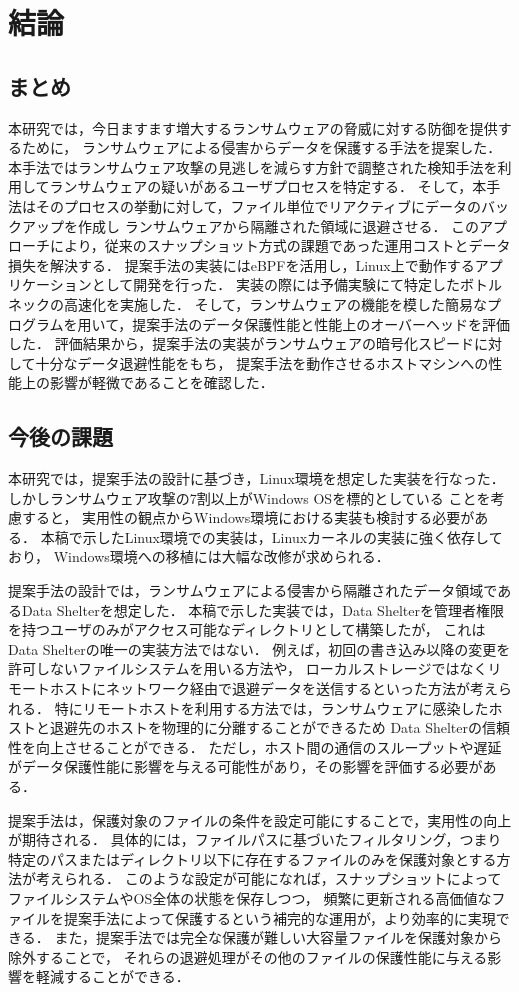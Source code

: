 \chapter{結論}
\label{chap:conclusion}
\section{まとめ}
本研究では，今日ますます増大するランサムウェアの脅威に対する防御を提供するために，
ランサムウェアによる侵害からデータを保護する手法を提案した．
本手法ではランサムウェア攻撃の見逃しを減らす方針で調整された検知手法を利用してランサムウェアの疑いがあるユーザプロセスを特定する．
そして，本手法はそのプロセスの挙動に対して，ファイル単位でリアクティブにデータのバックアップを作成し
ランサムウェアから隔離された領域に退避させる．
このアプローチにより，従来のスナップショット方式の課題であった運用コストとデータ損失を解決する．
提案手法の実装にはeBPFを活用し，Linux上で動作するアプリケーションとして開発を行った．
実装の際には予備実験にて特定したボトルネックの高速化を実施した．
そして，ランサムウェアの機能を模した簡易なプログラムを用いて，提案手法のデータ保護性能と性能上のオーバーヘッドを評価した．
評価結果から，提案手法の実装がランサムウェアの暗号化スピードに対して十分なデータ退避性能をもち，
提案手法を動作させるホストマシンへの性能上の影響が軽微であることを確認した．

\section{今後の課題}
本研究では，提案手法の設計に基づき，Linux環境を想定した実装を行なった．
しかしランサムウェア攻撃の7割以上がWindows OSを標的としている \cite{trendmicro-report} ことを考慮すると，
実用性の観点からWindows環境における実装も検討する必要がある．
本稿で示したLinux環境での実装は，Linuxカーネルの実装に強く依存しており，
Windows環境への移植には大幅な改修が求められる．

提案手法の設計では，ランサムウェアによる侵害から隔離されたデータ領域であるData Shelterを想定した．
本稿で示した実装では，Data Shelterを管理者権限を持つユーザのみがアクセス可能なディレクトリとして構築したが，
これはData Shelterの唯一の実装方法ではない．
例えば，初回の書き込み以降の変更を許可しないファイルシステムを用いる方法や，
ローカルストレージではなくリモートホストにネットワーク経由で退避データを送信するといった方法が考えられる．
特にリモートホストを利用する方法では，ランサムウェアに感染したホストと退避先のホストを物理的に分離することができるため
Data Shelterの信頼性を向上させることができる．
ただし，ホスト間の通信のスループットや遅延がデータ保護性能に影響を与える可能性があり，その影響を評価する必要がある．

提案手法は，保護対象のファイルの条件を設定可能にすることで，実用性の向上が期待される．
具体的には，ファイルパスに基づいたフィルタリング，つまり特定のパスまたはディレクトリ以下に存在するファイルのみを保護対象とする方法が考えられる．
このような設定が可能になれば，スナップショットによってファイルシステムやOS全体の状態を保存しつつ，
頻繁に更新される高価値なファイルを提案手法によって保護するという補完的な運用が，より効率的に実現できる．
また，提案手法では完全な保護が難しい大容量ファイルを保護対象から除外することで，
それらの退避処理がその他のファイルの保護性能に与える影響を軽減することができる．
